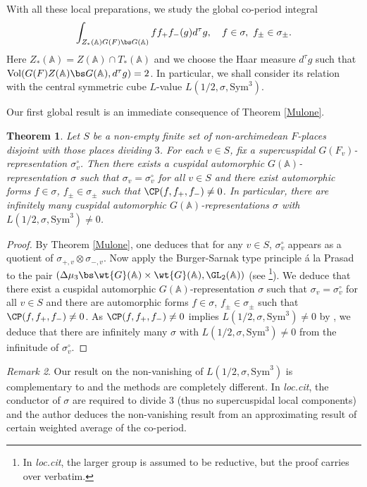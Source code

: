 \documentclass[11pt,reqno]{amsart}
\newcommand{\BA}{{\mathbb {A}}} \newcommand{\BB}{{\mathbb {B}}}
\newcommand{\Sym}{{\mathrm{Sym}}}\newcommand{\sgn}{{\mathrm{sgn}}}
\newcommand{\Vol}{{\mathrm{Vol}}}\newcommand{\vol}{{\mathrm{vol}}}
\theoremstyle{plain}
\newtheorem{thm}{Theorem}[section] \newtheorem{cor}[thm]{Corollary}
\theoremstyle{remark} \newtheorem{remark}[thm]{Remark}
\theoremstyle{definition} \newtheorem{exercise}[thm]{Exercise}
\theoremstyle{definition} \newtheorem{example}[thm]{Example} \newtheorem{condition}[thm]{Condition}
\numberwithin{equation}{section}
\renewcommand{\-}{\text{--}}
\begin{document}
 



With all these local preparations, we study the  global co-period integral 
 \[\int_{Z_*(\BA)G(F)\bs G(\BA)}f f_+ f_-(g)d^\tau g,\quad f\in\sigma,\ f_\pm\in\sigma_\pm.\]
 Here $Z_*(\BA)=Z(\BA)\cap T_*(\BA)$ and  we choose the
  Haar measure $d^\tau g$  such that 
$\Vol(G(F)Z(\BA)\bs G(\BA),d^\tau g)=2$. 
In particular, we shall consider its relation with the central  symmetric cube $L$-value $L(1/2,\sigma,\Sym^3)$.

Our first global result is an immediate consequence of Theorem \ref{Mulone}. 
\begin{thm}\label{Non-vanishing} Let $S$ be a non-empty finite set of non-archimedean $F$-places disjoint with those places dividing $3$. For each $v\in S$, fix a supercuspidal $G(F_v)$-representation $\sigma_v^\circ$. Then there exists a cuspidal automorphic $G(\BA)$-representation $\sigma$ such that $\sigma_v=\sigma_v^\circ$ for all $v\in S$ and there exist automorphic forms $f\in\sigma$, $f_\pm\in\sigma_\pm$ such that $\CP(f,f_+,f_-)\neq0$. In particular, there are infinitely many cuspidal automorphic $G(\BA)$-representations $\sigma$ with $L(1/2,\sigma,\Sym^3)\neq0$.
\end{thm}
\begin{proof}By Theorem \ref{Mulone}, one deduces that for any $v \in S$,
$\sigma_v^\circ$ appears as a quotient of $\sigma_{+,v}\otimes\sigma_{-,v}$. Now apply the Burger-Sarnak type principle \'a la Prasad to the pair  $(\Delta\mu_3\bs \wt{G}(\BA)\times\wt{G}(\BA), \GL_2(\BA))$ (see \cite[Lemma 1]{Pra07}\footnote{In \textit{loc.cit},  the larger group  is assumed to be reductive, but the proof carries over verbatim.}).  We deduce that  
there exist a cuspidal automorphic $G(\BA)$-representation $\sigma$ such that $\sigma_v=\sigma_v^\circ$ for all $v\in S$ and there are automorphic forms $f\in\sigma$, $f_\pm\in\sigma_\pm$ such that $\CP(f,f_+,f_-)\neq0$. As $\CP(f,f_+,f_-)\neq0$ implies $L(1/2,\sigma,\Sym^3)\neq0$
by \cite{GJR01}, we deduce that there are infinitely many $\sigma$ with $L(1/2,\sigma,\Sym^3)\neq0$ from the infinitude of $\sigma_v^\circ$.
\end{proof}
\begin{remark}Our result on the non-vanishing of $L(1/2,\sigma,\Sym^3)$ is complementary to \cite{HJL23} and the methods are completely different. In \textit{loc.cit},   the conductor of $\sigma$ are required to divide $3$ (thus no supercuspidal local components) and the author deduces the non-vanishing result from an approximating result of certain weighted average of the co-period.
\end{remark}
\end{document}

